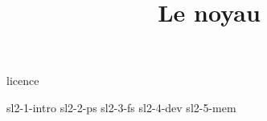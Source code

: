 \documentclass [xcolor=table] {beamer}
\title {Le noyau}
\begin{document}

 {licence}

 {sl2-1-intro}
 {sl2-2-ps}
 {sl2-3-fs}
 {sl2-4-dev}
 {sl2-5-mem}
\end{document}
